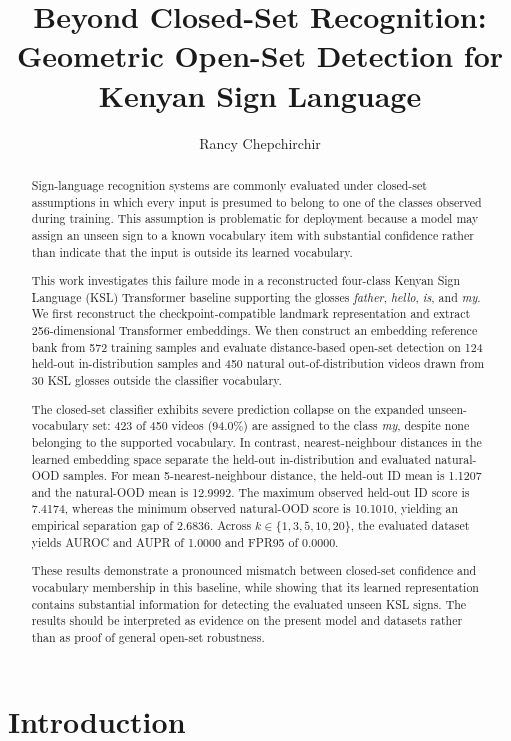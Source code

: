 \documentclass[11pt]{article}
\title{
    Beyond Closed-Set Recognition:
    Geometric Open-Set Detection for
    Kenyan Sign Language
}
\author{
    Rancy Chepchirchir
}
\date{}
\begin{document}
\maketitle

\begin{abstract}
Sign-language recognition systems are commonly evaluated
under closed-set assumptions in which every input is presumed
to belong to one of the classes observed during training.
This assumption is problematic for deployment because a model
may assign an unseen sign to a known vocabulary item with
substantial confidence rather than indicate that the input is
outside its learned vocabulary.

This work investigates this failure mode in a reconstructed
four-class Kenyan Sign Language (KSL) Transformer baseline
supporting the glosses \emph{father}, \emph{hello}, \emph{is},
and \emph{my}. We first reconstruct the checkpoint-compatible
landmark representation and extract 256-dimensional Transformer
embeddings. We then construct an embedding reference bank from
572 training samples and evaluate distance-based open-set
detection on 124 held-out in-distribution samples and 450
natural out-of-distribution videos drawn from 30 KSL glosses
outside the classifier vocabulary.

The closed-set classifier exhibits severe prediction collapse
on the expanded unseen-vocabulary set: 423 of 450 videos
(94.0\%) are assigned to the class \emph{my}, despite none
belonging to the supported vocabulary. In contrast,
nearest-neighbour distances in the learned embedding space
separate the held-out in-distribution and evaluated natural-OOD
samples. For mean 5-nearest-neighbour distance, the held-out
ID mean is 1.1207 and the natural-OOD mean is 12.9992.
The maximum observed held-out ID score is 7.4174, whereas
the minimum observed natural-OOD score is 10.1010, yielding
an empirical separation gap of 2.6836. Across
$k\in\{1,3,5,10,20\}$, the evaluated dataset yields AUROC
and AUPR of 1.0000 and FPR95 of 0.0000.

These results demonstrate a pronounced mismatch between
closed-set confidence and vocabulary membership in this
baseline, while showing that its learned representation
contains substantial information for detecting the evaluated
unseen KSL signs. The results should be interpreted as evidence
on the present model and datasets rather than as proof of
general open-set robustness.
\end{abstract}


\section{Introduction}
\end{document}
